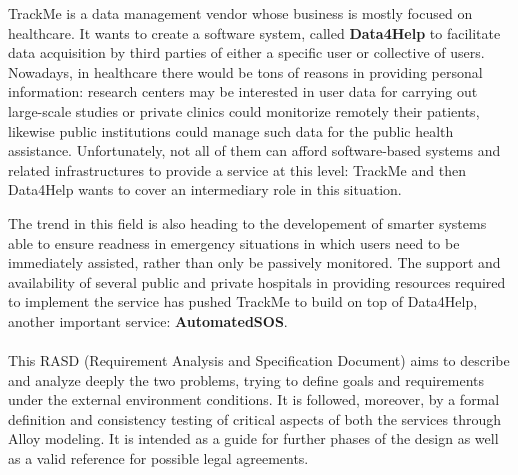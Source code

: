 
\begin{flushleft}
{\raggedright}
TrackMe is a data management vendor whose business is mostly focused on healthcare. It wants to create a software system, called \textbf{Data4Help} to facilitate data acquisition by third parties of either a specific user or collective of users. Nowadays, in healthcare there would be tons of reasons in providing personal information: research centers may be interested in user data for carrying out large-scale studies or private clinics could monitorize remotely their patients, likewise public institutions could manage such data for the public health assistance. Unfortunately, not all of them can afford software-based systems and related infrastructures to provide a service at this level: TrackMe and then Data4Help wants to cover an intermediary role in this situation.\par
The trend in this field is also heading to the developement of smarter systems able to ensure readness in emergency situations in which users need to be immediately assisted, rather than only be passively monitored. The support and availability of several public and private hospitals in providing resources required to implement the service has pushed TrackMe to build on top of Data4Help, another important service: \textbf{AutomatedSOS}. \par
\paragraph{}
This RASD (Requirement Analysis and Specification Document) aims to describe and analyze deeply the two problems, trying to define goals and requirements under the external environment conditions. It is followed, moreover, by a formal definition and consistency testing of critical aspects of both the services through Alloy modeling. It is intended as a guide for further phases of the design as well as a valid reference for possible legal agreements.

{}


\end{flushleft}
